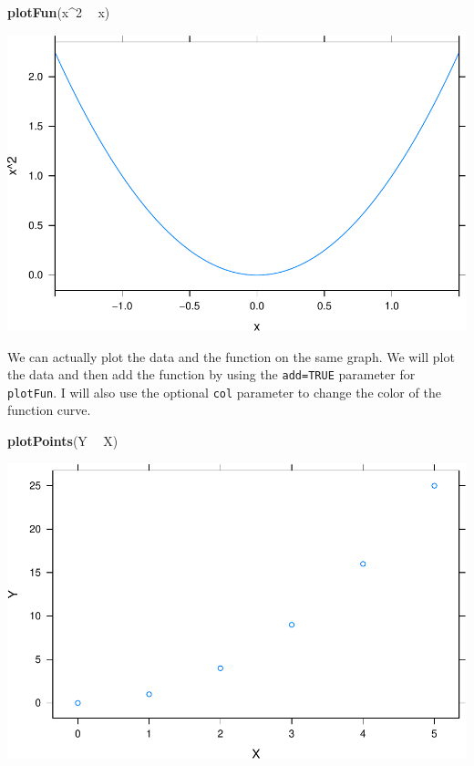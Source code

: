 \documentclass[
]{book}
\newenvironment{Shaded}{\begin{snugshade}}{\end{snugshade}}
\newcommand{\DecValTok}[1]{\textcolor[rgb]{0.00,0.00,0.81}{#1}}
\newcommand{\KeywordTok}[1]{\textcolor[rgb]{0.13,0.29,0.53}{\textbf{#1}}}
\newcommand{\NormalTok}[1]{#1}
\newcommand{\OperatorTok}[1]{\textcolor[rgb]{0.81,0.36,0.00}{\textbf{#1}}}
\newcommand{\StringTok}[1]{\textcolor[rgb]{0.31,0.60,0.02}{#1}}
\begin{document}
\begin{Shaded}
\begin{Highlighting}[]
\KeywordTok{plotFun}\NormalTok{(x}\OperatorTok{^}\DecValTok{2} \OperatorTok{~}\StringTok{ }\NormalTok{x)}
\end{Highlighting}
\end{Shaded}

\includegraphics{_bookdown_files/math135_handbook_files/figure-latex/unnamed-chunk-66-1.pdf}

We can actually plot the data and the function on the same graph. We will plot the data and then add the function by using the \texttt{add=TRUE} parameter for \texttt{plotFun}. I will also use the optional \texttt{col} parameter to change the color of the function curve.

\begin{Shaded}
\begin{Highlighting}[]
\KeywordTok{plotPoints}\NormalTok{(Y }\OperatorTok{~}\StringTok{ }\NormalTok{X)}
\end{Highlighting}
\end{Shaded}

\includegraphics{_bookdown_files/math135_handbook_files/figure-latex/unnamed-chunk-67-1.pdf}
\end{document}
